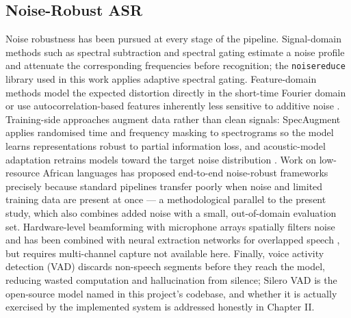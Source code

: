 \documentclass[12pt]{report}
\begin{document}
\subsection{Noise-Robust ASR}
Noise robustness has been pursued at every stage of the pipeline. Signal-domain methods such as spectral subtraction and spectral gating estimate a noise profile and attenuate the corresponding frequencies before recognition; the \texttt{noisereduce} library used in this work applies adaptive spectral gating. Feature-domain methods model the expected distortion directly in the short-time Fourier domain \cite{astudillo2013computing} or use autocorrelation-based features inherently less sensitive to additive noise \cite{farahani2017autocorrelation}. Training-side approaches augment data rather than clean signals: SpecAugment \cite{park2019specaugment} applies randomised time and frequency masking to spectrograms so the model learns representations robust to partial information loss, and acoustic-model adaptation retrains models toward the target noise distribution \cite{li2014overview,bhardwaj2021usage}. Work on low-resource African languages has proposed end-to-end noise-robust frameworks precisely because standard pipelines transfer poorly when noise and limited training data are present at once \cite{ejigu2025noise} --- a methodological parallel to the present study, which also combines added noise with a small, out-of-domain evaluation set. Hardware-level beamforming with microphone arrays spatially filters noise and has been combined with neural extraction networks for overlapped speech \cite{chen2018multi}, but requires multi-channel capture not available here. Finally, voice activity detection (VAD) discards non-speech segments before they reach the model, reducing wasted computation and hallucination from silence; Silero VAD is the open-source model named in this project's codebase, and whether it is actually exercised by the implemented system is addressed honestly in Chapter II.
\end{document}
